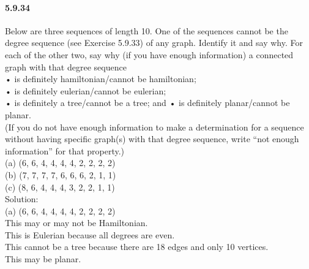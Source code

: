 \documentclass{article}
\begin{document}
\paragraph{5.9.34}
Below are three sequences of length 10. One of the sequences cannot be the degree sequence (see Exercise 5.9.33) of any graph. Identify it and say why. For each of the other two, say why (if you have enough information) a connected graph with that degree sequence\\
• is definitely hamiltonian/cannot be hamiltonian;\\
• is definitely eulerian/cannot be eulerian;\\
• is definitely a tree/cannot be a tree; and
• is definitely planar/cannot be planar.\\
(If you do not have enough information to make a determination for a sequence without having specific graph(s) with that degree sequence, write “not enough information” for that property.)\\
(a) (6, 6, 4, 4, 4, 4, 2, 2, 2, 2)\\
(b) (7, 7, 7, 7, 6, 6, 6, 2, 1, 1)\\
(c) (8, 6, 4, 4, 4, 3, 2, 2, 1, 1)\\
Solution:\\
(a) (6, 6, 4, 4, 4, 4, 2, 2, 2, 2)\\
This may or may not be Hamiltonian.\\
This is Eulerian because all degrees are even.\\
This cannot be a tree because there are 18 edges and only 10 vertices.\\
This may be planar.
\end{document}
